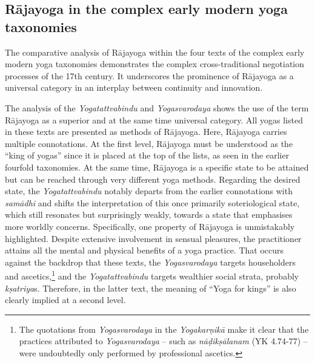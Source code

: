 \subsection{Rājayoga in the complex early modern yoga taxonomies}

The comparative analysis of Rājayoga within the four texts of the complex early modern yoga taxonomies demonstrates the complex cross-traditional negotiation processes of the 17th century. It underscores the prominence of Rājayoga as a universal category in an interplay between continuity and innovation.

The analysis of the \emph{Yogatattvabindu} and \emph{Yogasvarodaya} shows the use of the term Rājayoga as a superior and at the same time universal category. All yogas listed in these texts are presented as methods of Rājayoga. Here, Rājayoga carries multiple connotations. At the first level, Rājayoga must be understood as the ``king of yogas'' since it is placed at the top of the lists, as seen in the earlier fourfold taxonomies. At the same time, Rājayoga is a specific state to be attained but can be reached through very different yoga methods.
Regarding the desired state, the \emph{Yogatattvabindu} notably departs from the earlier connotations with \textit{samādhi} and shifts the interpretation of this once primarily soteriological state, which still resonates but surprisingly weakly, towards a state that emphasises more worldly concerns. Specifically, one property of Rājayoga is unmistakably highlighted. Despite extensive involvement in sensual pleasures, the practitioner attains all the mental and physical benefits of a yoga practice. That occurs against the backdrop that these texts, the \emph{Yogasvarodaya} targets householders and ascetics,\footnote{The quotations from \emph{Yogasvarodaya} in the \emph{Yogakarṇikā} make it clear that the practices attributed to \emph{Yogasvarodaya} – such as \textit{nāḍikṣālanam} (YK 4.74-77) – were undoubtedly only performed by professional ascetics.} and the \emph{Yogatattvabindu} targets wealthier social strata, probably \textit{kṣatriya}s. Therefore, in the latter text, the meaning of ``Yoga for kings'' is also clearly implied at a second level.
